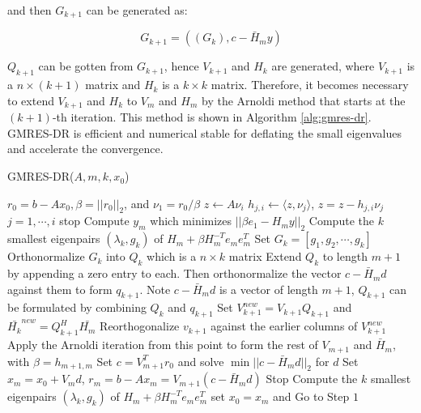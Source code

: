 {and then $G_{k+1}$ can be generated as:

\begin{equation}
	G_{k+1}= ((G_k), c-\bar{H}_my)
\end{equation}

$Q_{k+1}$ can be gotten from $G_{k+1}$, hence $V_{k+1}$ and $H_k$ are generated, where $V_{k+1}$ is a $n \times (k+1)$ matrix and $H_k$ is a $k \times k$ matrix. Therefore, it becomes necessary to extend $V_{k+1}$ and $H_k$ to $V_m$ and $H_m$ by the Arnoldi method that starts at the $(k+1)$-th iteration. This method is shown in Algorithm \ref{alg:gmres-dr}. GMRES-DR is efficient and numerical stable for deflating the small eigenvalues and accelerate the convergence.

\begin{algorithm}[t]
	\caption{GMRES-DR($A, m,k,x_0$)}
	\label{alg:gmres-dr}
	\begin{algorithmic}[1]
		\State $r_0=b-A x_0, \beta=||r_0||_2$, and $\nu_1=r_0/\beta$
		\State $z \leftarrow A\nu_i$
		\State $h_{j,i} \leftarrow \langle z,\nu_j\rangle$, $z = z- h_{j,i}\nu_j$ $j=1,\cdots,i$
		\State stop
		\Else
		\EndIf
		\EndFor
		\State Compute $y_m$ which minimizes $||\beta e_1-H_m y||_2$ 
		\State Compute the $k$ smallest eigenpairs $(\lambda_k, g_k)$ of $H_m+\beta H_m^{-T}e_me_m^T$
		\State Set $G_k=[g_1,g_2,\cdots,g_k]$
		\State Orthonormalize $G_k$ into $Q_{k}$ which is a $n \times k$ matrix
		\State Extend $Q_k$ to length $m+1$ by appending a zero entry to each. Then orthonormalize the vector $c-\bar{H}_m d$ against them to form $q_{k+1}$. Note $c-\bar{H}_m d$ is a vector of length $m+1$, $Q_{k+1}$ can be formulated by combining $Q_k$ and $q_{k+1}$
		\State Set $V_{k+1}^{new} = V_{k+1}Q_{k+1}$ and $\bar{H_{k}}^{new} = Q_{k+1}^H \bar{H_m}$
		\State Reorthogonalize $v_{k+1}$ against the earlier columns of $V_{k+1}^{new}$
		\State Apply the Arnoldi iteration from this point to form the rest of $V_{m+1}$ and $\bar{H}_m$, with $\beta=h_{m+1,m}$
		\State Set $c=V_{m+1}^Tr_0$ and solve $\min||c-\bar{H}_md||_2$ for $d$
		\State Set $x_m=x_0+V_md$, $r_m=b-Ax_m=V_{m+1}(c-\bar{H}_md)$
		\State Stop
		\EndIf
		\State  Compute the $k$ smallest eigenpairs $(\lambda_k, g_k)$ of $H_m+\beta H_m^{-T}e_me_m^T$
		\State set $x_0 = x_m$ and Go to Step $1$
	\end{algorithmic}
\end{algorithm}

}
